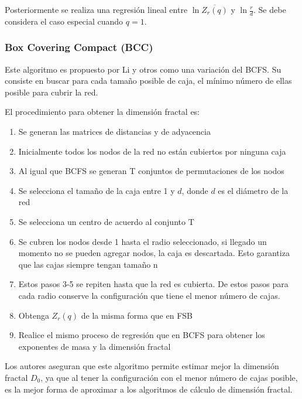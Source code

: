 Posteriormente se realiza una regresión lineal entre $\ln \overline{Z_r(q)}$ y $\ln\frac{r}{d}$. Se debe considera el caso especial cuando $q=1$.


\subsubsection{Box Covering Compact (BCC)}

Este algoritmo es propuesto por Li y otros\cite{Li2014} como una variación del BCFS. Su consiste en buscar para cada tamaño posible de caja, el mínimo número de ellas posible para cubrir la red.

El procedimiento para obtener la dimensión fractal es:

\begin{enumerate}
    \item Se generan las matrices de distancias y de adyacencia
    \item Inicialmente todos los nodos de la red no están cubiertos por ninguna caja
    \item Al igual que BCFS se generan T conjuntos de permutaciones de los nodos
    \item Se selecciona el tamaño de la caja entre 1 y $d$, donde $d$ es el diámetro de la red
    \item Se selecciona un centro de acuerdo al conjunto T
    \item Se cubren los nodos desde 1 hasta el radio seleccionado, si llegado un momento no se pueden agregar nodos, la caja es descartada. Esto garantiza que las cajas siempre tengan tamaño n
    \item Estos pasos 3-5 se repiten hasta que la red es cubierta. De estos pasos para cada radio conserve la configuración que tiene el menor número de cajas.
    \item Obtenga $Z_r(q)$ de la misma forma que en FSB
    \item Realice el mismo proceso de regresión que en BCFS para obtener los exponentes de masa y la dimensión fractal
\end{enumerate}

Los autores aseguran que este algoritmo permite estimar mejor la dimensión fractal $D_0$, ya que al tener la configuración con el menor número de cajas posible, es la mejor forma de aproximar a los algoritmos de cálculo de dimensión fractal.
